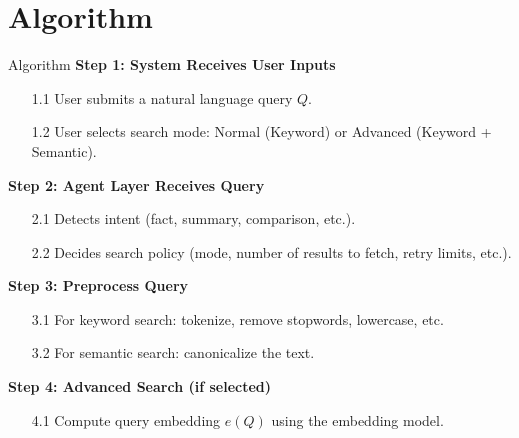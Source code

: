 \section{Algorithm}

\begin{frame}{Algorithm}
\textbf{Step 1: System Receives User Inputs}
\begin{itemize}
  \item[1.1] User submits a natural language query $Q$.
  \item[1.2] User selects search mode: Normal (Keyword) or Advanced (Keyword + Semantic).
\end{itemize}

\textbf{Step 2: Agent Layer Receives Query}
\begin{itemize}
  \item[2.1] Detects intent (fact, summary, comparison, etc.).
  \item[2.2] Decides search policy (mode, number of results to fetch, retry limits, etc.).
\end{itemize}

\textbf{Step 3: Preprocess Query}
\begin{itemize}
  \item[3.1] For keyword search: tokenize, remove stopwords, lowercase, etc.
  \item[3.2] For semantic search: canonicalize the text.
\end{itemize}

\textbf{Step 4: Advanced Search (if selected)}
\begin{itemize}
  \item[4.1] Compute query embedding $e(Q)$ using the embedding model.
\end{itemize}
\end{frame}

